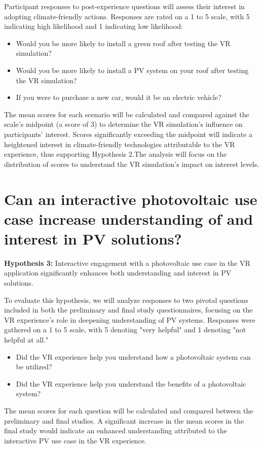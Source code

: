 \documentclass[draft, final]{vutinfth} %
\begin{document}
Participant responses to post-experience questions will assess their interest in adopting climate-friendly actions. Responses are rated on a 1 to 5 scale, with 5 indicating high likelihood and 1 indicating low likelihood:
\begin{itemize}
\item Would you be more likely to install a green roof after testing the VR simulation?
\item Would you be more likely to install a PV system on your roof after testing the VR simulation?
\item If you were to purchase a new car, would it be an electric vehicle?
\end{itemize}
The mean scores for each scenario will be calculated and compared against the scale's midpoint (a score of 3) to determine the VR simulation's influence on participants' interest. Scores significantly exceeding the midpoint will indicate a heightened interest in climate-friendly technologies attributable to the VR experience, thus supporting Hypothesis 2.The analysis will focus on the distribution of scores to understand the VR simulation's impact on interest levels.


\section{Can an interactive photovoltaic use case increase understanding of and interest in PV solutions?}

\textbf{Hypothesis 3:} Interactive engagement with a photovoltaic use case in the VR application significantly enhances both understanding and interest in PV solutions.

To evaluate this hypothesis, we will analyze responses to two pivotal questions included in both the preliminary and final study questionnaires, focusing on the VR experience's role in deepening understanding of PV systems. Responses were gathered on a 1 to 5 scale, with 5 denoting "very helpful" and 1 denoting "not helpful at all."
\begin{itemize}
    \item Did the VR experience help you understand how a photovoltaic system can be utilized?
    \item Did the VR experience help you understand the benefits of a photovoltaic system?
\end{itemize}
The mean scores for each question will be calculated and compared between the preliminary and final studies. A significant increase in the mean scores in the final study would indicate an enhanced understanding attributed to the interactive PV use case in the VR experience.
\end{document}
